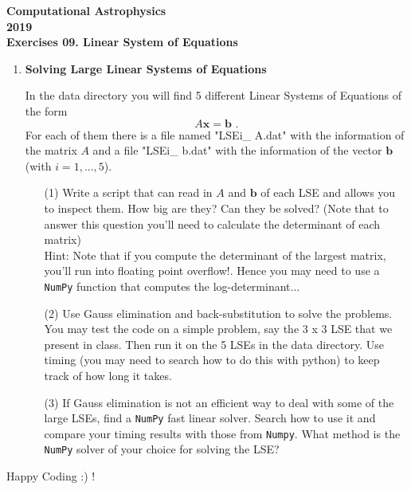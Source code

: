 \documentclass[11pt]{article}
\begin{document}
\begin{center}
\large \bf Computational Astrophysics \rm \\
2019\\
{\small Exercises 09. Linear System of Equations}
\end{center}

\begin{enumerate}

\item {\bf Solving Large Linear Systems of Equations}

In the data directory you will find 5 different Linear Systems of Equations of the form
\begin{equation}
 A \mathbf{x} = \mathbf{b}\,\,.
  \end{equation} 
For each of them there is a file named "LSEi\_ A.dat" with the information of the matrix $A$ and a file "LSEi\_ b.dat" with the information of the vector $\textbf{b}$ (with $i = 1,...,5$).


\begin{enumerate}
\item[(1)] Write a script that can read in $A$ and $\mathbf{b}$ of
  each LSE and allows you to inspect them. How big are they? Can they
  be solved? (Note that to answer this question you'll need to calculate the determinant of each matrix) \\
  
  Hint: Note that if you compute the determinant of the largest matrix,
    you'll run into floating point overflow!. Hence you may need to use  a {\tt NumPy} function
    that computes the log-determinant...

\item[(2)] Use Gauss elimination and back-substitution to solve the problems. \\

  You may test the code on a simple problem, say the 3 x 3 LSE that we present in class.
   Then run it on the 5 LSEs in the data directory.  Use timing (you may need to search how to do this with python) to
  keep track of how long it takes.

\item[(3)] If Gauss elimination is not  an
  efficient way to deal with some of the large LSEs, find a {\tt NumPy} 
  fast linear solver.  Search how to use it and compare your
  timing results with those from {\tt Numpy}. What method is
  the {\tt NumPy} solver of your choice for solving the LSE?
\end{enumerate}
\end{enumerate}
Happy Coding :) !
\end{document}
